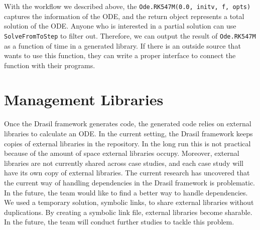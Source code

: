 With the workflow we described above, the \verb|Ode.RK547M(0.0, initv, f, opts)| captures the information of the ODE, and the return object represents a total solution of the ODE. Anyone who is interested in a partial solution can use \verb|SolveFromToStep| to filter out. Therefore,
we can output the result of \verb|Ode.RK547M| as a function of time in a generated library. If there is an outside source that wants to use this function, they can write a proper interface to connect the function with their programs. 

\section{Management Libraries}
Once the Drasil framework generates code, the generated code relies on external libraries to calculate an ODE. In the current setting, the Drasil framework keeps copies of external libraries in the repository. In the long run this is not practical because of the amount of space external libraries occupy. Moreover, external libraries are not currently shared across case studies, and each case study will have its own copy of external libraries. The current research has uncovered that the current way of handling dependencies in the Drasil framework is problematic. In the future, the team would like to find a better way to handle dependencies. We used a temporary solution, symbolic links, to share external libraries without duplications. By creating a symbolic link file, external libraries become sharable. In the future, the team will conduct further studies to tackle this problem.
